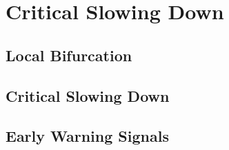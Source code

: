 \section{Critical Slowing Down}
\label{sec:csd}

\subsection{Local Bifurcation}

\subsection{Critical Slowing Down}

\subsection{Early Warning Signals}